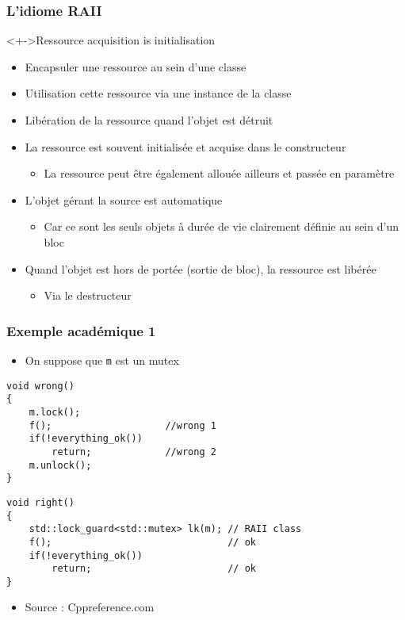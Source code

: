 \begin{frame}
\frametitle{L'idiome RAII}
\begin{exampleblock}<+->{Ressource acquisition is initialisation}
	\begin{itemize}[<+->]
	\item Encapsuler une ressource au sein d'une classe	
	\item Utilisation cette ressource via une instance de la classe
	\item Libération de la ressource quand l'objet est détruit
	\end{itemize}
\end{exampleblock}
\begin{itemize}[<+->]
\item La ressource est souvent initialisée et acquise dans le constructeur
	\begin{itemize}
	\item La ressource peut être également allouée ailleurs et passée en paramètre
	\end{itemize}
\item L'objet gérant la source est automatique
	\begin{itemize}
	\item Car ce sont les seuls objets à durée de vie clairement définie au sein d'un bloc
	\end{itemize}
\item Quand l'objet est hors de portée (sortie de bloc), la ressource est libérée
	\begin{itemize}
	\item Via le destructeur
	\end{itemize}
\end{itemize}
\end{frame}

\begin{frame}[containsverbatim]
\frametitle{Exemple académique 1}
\begin{itemize}
\item On suppose que \texttt{m} est un mutex
\end{itemize}
\begin{lstlisting} 
void wrong()
{
    m.lock();                    
    f();                    //wrong 1                  
    if(!everything_ok())    
    	return;             //wrong 2
    m.unlock();                  
}
\end{lstlisting}
\begin{lstlisting}
void right()
{
    std::lock_guard<std::mutex> lk(m); // RAII class
    f();                               // ok
    if(!everything_ok()) 
    	return;                        // ok
}
\end{lstlisting}
\begin{itemize}
\item Source : Cppreference.com
\end{itemize}
\end{frame}

